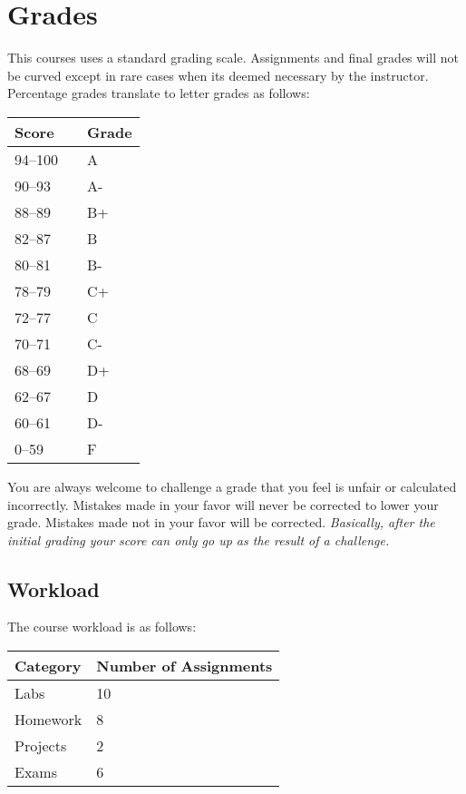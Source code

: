 \documentclass[10pt]{article}
\begin{document}
\section{Grades}

This courses uses a standard grading scale.  Assignments and final grades will not be curved except in rare cases when its deemed necessary by the instructor.  Percentage grades translate to letter grades as follows:

\begin{center}
\begin{small}
\begin{tabular}{lcl}
Score & & Grade \\ \toprule
94--100 & & A \\
90--93 & & A- \\
88--89 & & B+ \\
82--87 & & B \\
80--81 & & B- \\
78--79 & & C+ \\
72--77 & & C \\
70--71 & & C- \\
68--69 & & D+ \\
62--67 & & D \\
60--61 & & D- \\
0--59 & & F
\end{tabular}
\end{small}
\end{center}


You are always welcome to challenge a grade that you feel is unfair or calculated incorrectly.  Mistakes made in your favor will never be corrected to lower your grade.  Mistakes made not in your favor will be corrected.  \textit{Basically, after the initial grading your score can only go up as the result of a challenge.}

\subsection{Workload}

The course workload is as follows:
\begin{center}
  \begin{tabular}{ll}
    Category & Number of Assignments \\ \toprule
    Labs & 10 \\
    Homework & 8 \\
    Projects & 2 \\
    Exams & 6
  \end{tabular}
\end{center}
\end{document}
